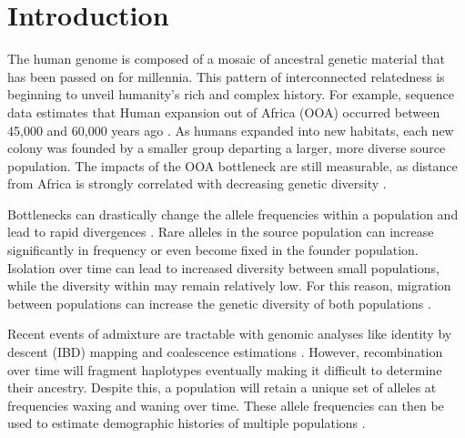 \documentclass[
11pt, %
oneside, %
english, %
doublespacing, %
headsepline, %
chapterinoneline, %
]{MastersDoctoralThesis} %
\begin{document}

\mainmatter %
\pagestyle{thesis} %

	
\section{Introduction}
The human genome is composed of a mosaic of ancestral genetic material that has been passed on for millennia.
This pattern of interconnected relatedness is beginning to unveil humanity's rich and complex history.
For example, sequence data estimates that Human expansion out of Africa (OOA) occurred between 45,000 and 60,000 years ago \citep{Henn2012}. 
As humans expanded into new habitats, each new colony was founded by a smaller group departing a larger, more diverse source population.
The impacts of the OOA bottleneck are still measurable, as distance from Africa is strongly correlated with decreasing genetic diversity \citep{Ramachandran2005}.

Bottlenecks can drastically change the allele frequencies within a population and lead to rapid divergences \citep{Rosenberg2002, Charlesworth2003}.
Rare alleles in the source population can increase significantly in frequency or even become fixed in the founder population.
Isolation over time can lead to increased diversity between small populations, while the diversity within may remain relatively low. 
For this reason, migration between populations can increase the genetic diversity of both populations \citep{Charlesworth2003}.

Recent events of admixture are tractable with genomic analyses like identity by descent (IBD) mapping and coalescence estimations \citep{Baharian2016}.
However, recombination over time will fragment haplotypes eventually making it difficult to determine their ancestry.
Despite this, a population will retain a unique set of alleles at frequencies waxing and waning over time.
These allele frequencies can then be used to estimate demographic histories of multiple populations \citep{Gravel2011}. 
\end{document}
